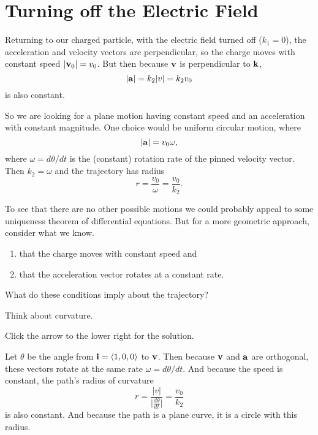 \documentclass{ximera}
\begin{document}
\section*{Turning off the Electric Field}

Returning to our charged particle, with the electric field turned off ($k_1=0$), the acceleration and velocity vectors are perpendicular, so the charge moves with constant speed $|{\bf v}_0| = v_0$. But then because ${\bf v}$ is perpendicular to ${\bf k}$,
\[
      |{\bf a}| = k_2 |v| = k_2 v_0
\]
is also constant.

So we are looking for a plane motion having constant speed and an acceleration with constant magnitude. One choice would be uniform circular motion, where
\[
    |{\bf a}| = v_0 \omega ,
\]
where $\omega = d\theta/dt$ is the (constant) rotation rate of the pinned velocity vector. Then $k_2 = \omega$ and the trajectory has radius
\[
   r = \frac{v_0}{\omega} = \frac{v_0}{k_2} .
\]

To see that there are no other possible motions we could probably appeal to some uniqueness theorem of differential equations. But for a more geometric approach, consider what we know.

\begin{enumerate}
\item that the charge moves with constant speed and

\item that the acceleration vector rotates at a constant rate.
\end{enumerate}

\begin{question}  \label{Qdtg4th5yg5}
What do these conditions imply about the trajectory?
\begin{hint}
Think about curvature.
\end{hint}

\begin{explanation}
Click the arrow to the lower right for the solution.

\begin{expandable}
Let $\theta$ be the angle from ${\bf i} = \langle 1, 0, 0\rangle$ to ${\bf v}$. Then because ${\bf v}$ and ${\bf a}$ are orthogonal, these vectors rotate at the same rate $\omega = d\theta/dt$. And because the speed is constant, the path's radius of curvature 
\[
  r = \frac{|v|}{\Big|\frac{d\theta}{dt} \Big|} = \frac{v_0}{k_2} 
\]
is also constant. And because the path is a plane curve, it is a circle with this radius.
\end{expandable}
\end{explanation}

\end{question} 
\end{document}
